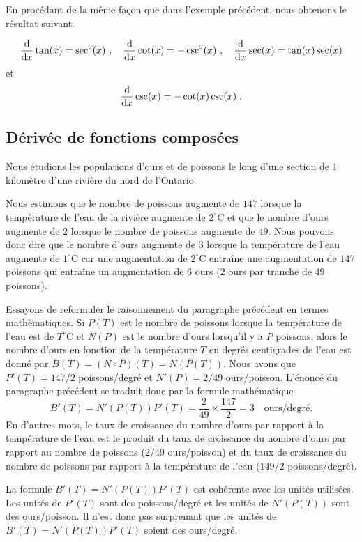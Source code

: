 {En procédant de la même façon que dans l'exemple précédent, nous
obtenons le résultat suivant.

\begin{focus}{\prp}
\[
\dfdx{\tan(x)}{x} = \sec^2(x) \ ,
\quad \dfdx{\cot(x)}{x} = -\csc^2(x) \ ,
\quad \dfdx{\sec(x)}{x} = \tan(x) \sec(x)
\]
et
\[
\dfdx{\csc(x)}{x} = -\cot(x) \csc(x) \; .
\]
\end{focus}

\subsection{Dérivée de fonctions composées}

\begin{egg}
Nous étudions les populations d'ours et de poissons le long d'une section
de $1$ kilomètre d'une rivière du nord de l'Ontario.

Nous estimons que le nombre de poissons augmente de $147$ lorsque la
température de l'eau de la rivière augmente de $2^\circ$C et que le
nombre d'ours augmente de $2$ lorsque le nombre de poissons augmente
de $49$.  Nous pouvons donc dire que le nombre d'ours augmente de $3$
lorsque la température de l'eau augmente de $1^\circ$C car une
augmentation de $2^\circ$C entraîne une augmentation de $147$ poissons
qui entraîne un augmentation de $6$ ours ($2$ ours par tranche de $49$
poissons).

Essayons de reformuler le raisonnement du paragraphe précédent en
termes mathématiques.  Si $P(T)$ est le nombre de poissons lorsque la
température de l'eau est de $T^\circ$C et $N(P)$ est le nombre d'ours
lorsqu'il y a $P$ poissons, alors le nombre d'ours en fonction de la
température $T$ en degrés centigrades de l'eau est donné par
$B(T) = (N\circ P)(T) = N(P(T))$.   Nous avons que $P'(T) = 147/2$
poissons/degré et $N'(P) = 2/49$ ours/poisson.  L'énoncé du paragraphe
précédent se traduit donc par la formule mathématique
\[
B'(T) = N'(P(T)) P'(T) = \frac{2}{49} \times \frac{147}{2} = 3
\quad \text{ours/degré} .
\]
En d'autres mots, le taux de croissance du nombre d'ours par rapport à
la température de l'eau est le produit du taux de croissance du nombre
d'ours par rapport au nombre de poissons ($2/49$ ours/poisson) et du
taux de croissance du nombre de poissons par rapport à la température
de l'eau ($149/2$ poissons/degré).

La formule $B'(T) = N'(P(T)) P'(T)$ est cohérente avec les
unités utilisées.  Les unités de $P'(T)$ sont des poissons/degré et
les unités de $N'(P(T))$ sont des ours/poisson.  Il n'est donc pas 
surprenant que les unités de $B'(T) = N'(P(T)) P'(T)$ soient
des ours/degré.
\end{egg}

}
